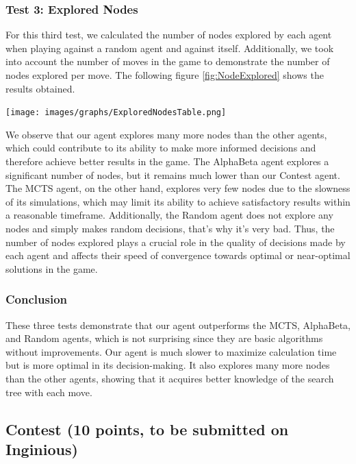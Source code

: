 \documentclass[11pt,a4paper]{report}
\begin{document}
\begin{answers}[23cm]

\subsubsection{Test 3: Explored Nodes}
For this third test, we calculated the number of nodes explored by each agent when playing against a random agent and against itself. Additionally, we took into account the number of moves in the game to demonstrate the number of nodes explored per move. The following figure \ref{fig:NodeExplored} shows the results obtained.

\begin{center}
\texttt{[image: images/graphs/ExploredNodesTable.png]}
\label{fig:NodeExplored}
\end{center}

We observe that our agent explores many more nodes than the other agents, which could contribute to its ability to make more informed decisions and therefore achieve better results in the game. The AlphaBeta agent explores a significant number of nodes, but it remains much lower than our Contest agent. The MCTS agent, on the other hand, explores very few nodes due to the slowness of its simulations, which may limit its ability to achieve satisfactory results within a reasonable timeframe. Additionally, the Random agent does not explore any nodes and simply makes random decisions, that's why it's very bad. Thus, the number of nodes explored plays a crucial role in the quality of decisions made by each agent and affects their speed of convergence towards optimal or near-optimal solutions in the game.

\subsubsection{Conclusion}
These three tests demonstrate that our agent outperforms the MCTS, AlphaBeta, and Random agents, which is not surprising since they are basic algorithms without improvements. Our agent is much slower to maximize calculation time but is more optimal in its decision-making. It also explores many more nodes than the other agents, showing that it acquires better knowledge of the search tree with each move.

\end{answers}

\subsection{Contest (10 points, to be submitted on Inginious)}
\end{document}
